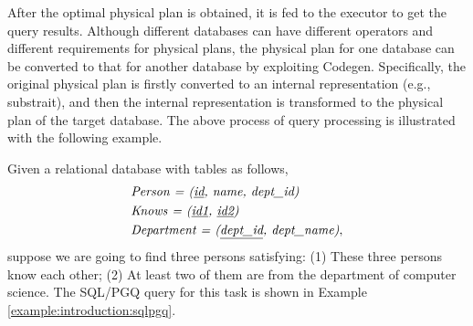 After the optimal physical plan is obtained, it is fed to the executor to get the query results.
Although different databases can have different operators and different requirements for physical plans, the physical plan for one database can be converted to that for another database by exploiting Codegen.
Specifically, the original physical plan is firstly converted to an internal representation (e.g., substrait), and then the internal representation is transformed to the physical plan of the target database.
The above process of query processing is illustrated with the following example.

\begin{example}
    Given a relational database with tables as follows,
    \begin{equation*}
        \begin{split}
            & \textit{Person = (\underline{id}, name, dept\_id)} \\
            & \textit{Knows = (\underline{id1}, \underline{id2})} \\
            & \textit{Department = (\underline{dept\_id}, dept\_name)}, \\
        \end{split}
    \end{equation*}
    suppose we are going to find three persons satisfying: 
    (1) These three persons know each other;
    (2) At least two of them are from the department of computer science.
    The SQL/PGQ query for this task is shown in Example \ref{example:introduction:sqlpgq}.      


\end{example}
